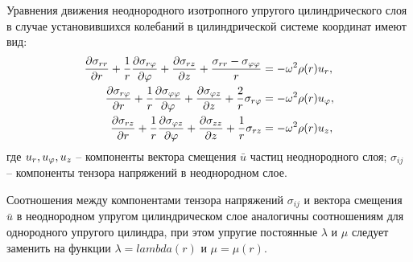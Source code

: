 Уравнения движения неоднородного изотропного упругого цилиндрического слоя в случае установившихся колебаний в цилиндрической системе координат имеют вид:
\begin{equation}
\begin{aligned}
\frac{\partial\sigma_{rr}}{
\partial r}+\frac{1}{r}\frac{\partial\sigma_{r\varphi}}{\partial\varphi}+\frac{\partial\sigma_{rz}}{\partial z}+\frac{\sigma_{rr}-\sigma_{\varphi\varphi}}{r}&=-\omega^2\rho(r)u_r,\\
\frac{\partial\sigma_{r\varphi}}{
\partial r}+\frac{1}{r}\frac{\partial\sigma_{\varphi\varphi}}{\partial\varphi}+\frac{\partial\sigma_{\varphi z}}{\partial z}+\frac{2}{r}\sigma_{r\varphi}&=-\omega^2\rho(r)u_{\varphi},\\
\frac{\partial\sigma_{rz}}{
\partial r}+\frac{1}{r}\frac{\partial\sigma_{\varphi z}}{\partial\varphi}+\frac{\partial\sigma_{zz}}{\partial z}+\frac{1}{r}\sigma_{rz}&=-\omega^2\rho(r)u_z,
\end{aligned}
\end{equation}
где $u_r, u_{\varphi}, u_z$ -- компоненты вектора смещения $\bar{u}$ частиц неоднородного слоя; $\sigma_{ij}$ -- компоненты тензора напряжений в неоднородном слое.

Соотношения между компонентами тензора напряжений $\sigma_{ij}$ и вектора смещения $\bar{u}$ в неоднородном упругом цилиндрическом слое аналогичны соотношениям для однородного упругого цилиндра, при этом упругие постоянные $\lambda$ и $\mu$ следует заменить на функции $\lambda=lambda(r)$ и $\mu=\mu(r).$

